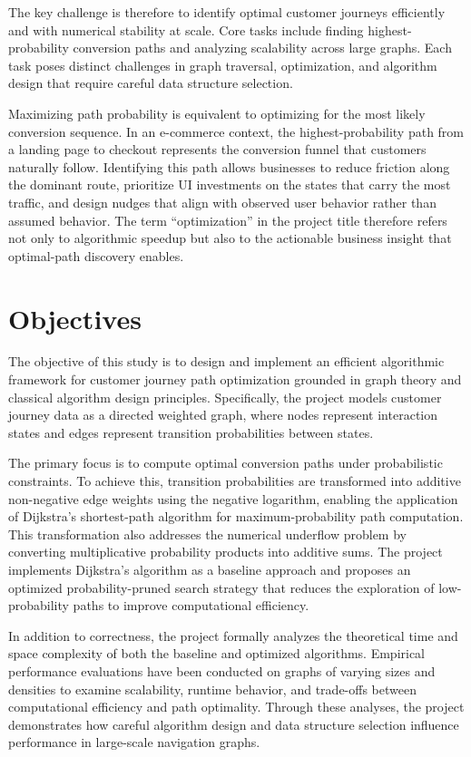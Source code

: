 The key challenge is therefore to identify optimal customer journeys efficiently and with numerical stability at scale. Core tasks include finding highest-probability conversion paths and analyzing scalability across large graphs. Each task poses distinct challenges in graph traversal, optimization, and algorithm design that require careful data structure selection.

Maximizing path probability is equivalent to optimizing for the most likely conversion sequence. In an e-commerce context, the highest-probability path from a landing page to checkout represents the conversion funnel that customers naturally follow. Identifying this path allows businesses to reduce friction along the dominant route, prioritize UI investments on the states that carry the most traffic, and design nudges that align with observed user behavior rather than assumed behavior. The term ``optimization'' in the project title therefore refers not only to algorithmic speedup but also to the actionable business insight that optimal-path discovery enables.

\section{Objectives}

The objective of this study is to design and implement an efficient algorithmic framework for customer journey path optimization grounded in graph theory and classical algorithm design principles. Specifically, the project models customer journey data as a directed weighted graph, where nodes represent interaction states and edges represent transition probabilities between states.

The primary focus is to compute optimal conversion paths under probabilistic constraints. To achieve this, transition probabilities are transformed into additive non-negative edge weights using the negative logarithm, enabling the application of Dijkstra's shortest-path algorithm for maximum-probability path computation. This transformation also addresses the numerical underflow problem by converting multiplicative probability products into additive sums. The project implements Dijkstra's algorithm as a baseline approach and proposes an optimized probability-pruned search strategy that reduces the exploration of low-probability paths to improve computational efficiency.

In addition to correctness, the project formally analyzes the theoretical time and space complexity of both the baseline and optimized algorithms. Empirical performance evaluations have been conducted on graphs of varying sizes and densities to examine scalability, runtime behavior, and trade-offs between computational efficiency and path optimality. Through these analyses, the project demonstrates how careful algorithm design and data structure selection influence performance in large-scale navigation graphs.

